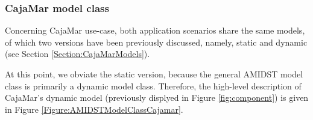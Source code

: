 

%
%



\subsubsection{CajaMar model class}\label{cajamarAMIDSTModels}
Concerning CajaMar use-case, both application scenarios share the same models, of which two versions have been previously discussed, namely, static and dynamic (see Section \ref{Section:CajaMarModels}). 

At this point, we obviate the static version, because the general AMIDST model class is primarily a dynamic model class. Therefore, the high-level description of CajaMar's dynamic model (previously displyed in Figure \ref{fig:component}) is given in Figure \ref{Figure:AMIDSTModelClassCajamar}. %


